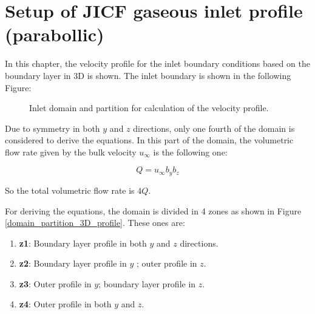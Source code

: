 \chapter{Setup of JICF gaseous inlet profile (parabollic)}
\label{app:JICF_BL_setup}


	
In this chapter, the velocity profile for the inlet boundary conditions based on the boundary layer in 3D is shown. The inlet boundary is shown in the following Figure:


\begin{figure}[h!]	
	\centering
%	
	\caption{Inlet domain and partition for calculation of the velocity profile.}
	\label{fig:domain_partition_3D_profile}
\end{figure}


Due to symmetry in both $y$ and $z$ directions, only one fourth of the domain is considered to derive the equations. In this part of the domain, the volumetric flow rate given by the bulk velocity $u_\infty$ is the following one:

\begin{equation}
\label{eq:volumetric_flow_rate_2D}
Q = u_\infty b_y b_z
\end{equation}	

So the total volumetric flow rate is $4Q$. 

For deriving the equations, the domain is divided in 4 zones as shown in Figure \ref{domain_partition_3D_profile}. These ones are:

\begin{enumerate}

	\item \textbf{z1}: Boundary layer profile in both $y$ and $z$ directions.
	
	\item \textbf{z2}: Boundary layer profile in $y$ ; outer profile in $z$.
	
	\item \textbf{z3}: Outer profile in $y$; boundary layer profile in $z$.
	
	\item \textbf{z4}: Outer profile in both $y$ and $z$.

\end{enumerate}
	
